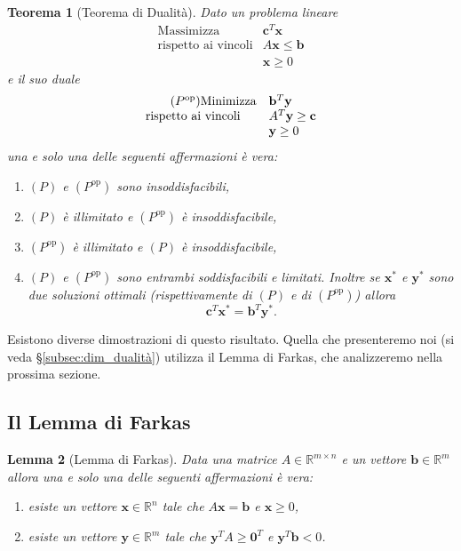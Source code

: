 \documentclass[italian, 12pt, reqno]{article}
\theoremstyle{myteo}
\newtheorem{theorem}{Teorema}[section]
\newtheorem{lemma}[theorem]{Lemma}
\numberwithin{equation}{section}
\newcommand{\dual}[1]{#1^{\text{op}}}
\begin{document}
\begin{theorem}[Teorema di Dualità]
  \label{teo:dualità}
  Dato un problema lineare
  \begin{equation*}
    \begin{array}{ll}
      \tag{\(P\)}
      \text{Massimizza} & \mathbf{c}^T\mathbf{x}\\
      \text{rispetto ai vincoli} & A\mathbf{x} \leq \mathbf{b}\\
                        & \mathbf{x} \geq 0
    \end{array}
  \end{equation*}
  e il suo duale
  \begin{equation*}
    \begin{array}{ll}
      \tag{\(\dual{P}\)}
      \text{Minimizza} & \mathbf{b}^T\mathbf{y}\\
      \text{rispetto ai vincoli} & A^T\mathbf{y} \geq \mathbf{c}\\
                        & \mathbf{y} \geq 0
    \end{array}
  \end{equation*}
  una e solo una delle seguenti affermazioni è vera:
  \begin{enumerate}
  \item \((P)\) e \((\dual{P})\) sono insoddisfacibili,
  \item \((P)\) è illimitato e \((\dual{P})\) è insoddisfacibile,
  \item \((\dual{P})\) è illimitato e \((P)\) è insoddisfacibile,
  \item \((P)\) e \((\dual{P})\) sono entrambi soddisfacibili e limitati.
    Inoltre se \(\mathbf{x}^*\) e \(\mathbf{y}^*\) sono due soluzioni ottimali (rispettivamente di \((P)\) e di \((\dual{P})\)) allora
    \[\mathbf{c}^T\mathbf{x}^* = \mathbf{b}^T\mathbf{y}^*.\]
  \end{enumerate}
\end{theorem}

Esistono diverse dimostrazioni di questo risultato.
Quella che presenteremo noi (si veda \S\ref{subsec:dim_dualità}) utilizza il Lemma di Farkas, che analizzeremo nella prossima sezione.

\subsection{Il Lemma di Farkas}
\label{subsec:lemma_di_farkas}

\begin{lemma}[Lemma di Farkas]
  \label{lemma:farkas}
  Data una matrice \(A\in\mathbb{R}^{m\times n}\) e un vettore \(\mathbf{b}\in\mathbb{R}^m\) allora una e solo una delle seguenti affermazioni è vera:
  \begin{enumerate}
  \item esiste un vettore \(\mathbf{x}\in\mathbb{R}^n\) tale che \(A\mathbf{x}=\mathbf{b}\) e \(\mathbf{x} \geq 0\),
  \item esiste un vettore \(\mathbf{y}\in\mathbb{R}^m\) tale che \(\mathbf{y}^TA \geq \mathbf{0}^T\) e \(\mathbf{y}^T\mathbf{b} < 0\).
  \end{enumerate}
\end{lemma}
\end{document}
